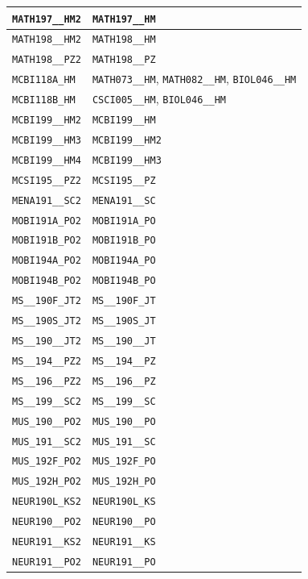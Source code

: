 \begin{longtable}{|p{4.4in}|p{4.4in}|}
    \verb|MATH197__HM2| & \verb|MATH197__HM|\\\hline
    \verb|MATH198__HM2| & \verb|MATH198__HM|\\\hline
    \verb|MATH198__PZ2| & \verb|MATH198__PZ|\\\hline
    \verb|MCBI118A_HM| & \verb|MATH073__HM|, \verb|MATH082__HM|, \verb|BIOL046__HM|\\\hline
    \verb|MCBI118B_HM| & \verb|CSCI005__HM|, \verb|BIOL046__HM|\\\hline
    \verb|MCBI199__HM2| & \verb|MCBI199__HM|\\\hline
    \verb|MCBI199__HM3| & \verb|MCBI199__HM2|\\\hline
    \verb|MCBI199__HM4| & \verb|MCBI199__HM3|\\\hline
    \verb|MCSI195__PZ2| & \verb|MCSI195__PZ|\\\hline
    \verb|MENA191__SC2| & \verb|MENA191__SC|\\\hline
    \verb|MOBI191A_PO2| & \verb|MOBI191A_PO|\\\hline
    \verb|MOBI191B_PO2| & \verb|MOBI191B_PO|\\\hline
    \verb|MOBI194A_PO2| & \verb|MOBI194A_PO|\\\hline
    \verb|MOBI194B_PO2| & \verb|MOBI194B_PO|\\\hline
    \verb|MS__190F_JT2| & \verb|MS__190F_JT|\\\hline
    \verb|MS__190S_JT2| & \verb|MS__190S_JT|\\\hline
    \verb|MS__190__JT2| & \verb|MS__190__JT|\\\hline
    \verb|MS__194__PZ2| & \verb|MS__194__PZ|\\\hline
    \verb|MS__196__PZ2| & \verb|MS__196__PZ|\\\hline
    \verb|MS__199__SC2| & \verb|MS__199__SC|\\\hline
    \verb|MUS_190__PO2| & \verb|MUS_190__PO|\\\hline
    \verb|MUS_191__SC2| & \verb|MUS_191__SC|\\\hline
    \verb|MUS_192F_PO2| & \verb|MUS_192F_PO|\\\hline
    \verb|MUS_192H_PO2| & \verb|MUS_192H_PO|\\\hline
    \verb|NEUR190L_KS2| & \verb|NEUR190L_KS|\\\hline
    \verb|NEUR190__PO2| & \verb|NEUR190__PO|\\\hline
    \verb|NEUR191__KS2| & \verb|NEUR191__KS|\\\hline
    \verb|NEUR191__PO2| & \verb|NEUR191__PO|\\\hline

\end{longtable}
